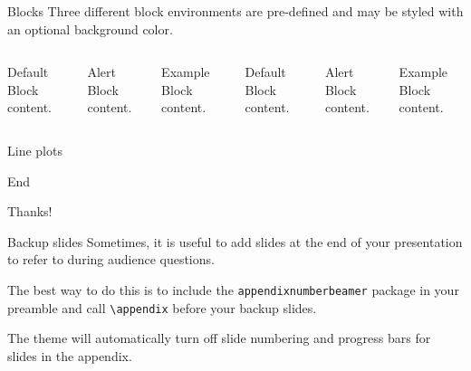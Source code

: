 \documentclass{kw}
\begin{document}
\begin{frame}{Blocks}
	Three different block environments are pre-defined and may be styled with an
	optional background color.
	
	\begin{columns}[T,onlytextwidth]
		\begin{block}{Default}
			Block content.
		\end{block}
		
		\begin{alertblock}{Alert}
			Block content.
		\end{alertblock}
		
		\begin{exampleblock}{Example}
			Block content.
		\end{exampleblock}
		
		
		\begin{block}{Default}
			Block content.
		\end{block}
		
		\begin{alertblock}{Alert}
			Block content.
		\end{alertblock}
		
		\begin{exampleblock}{Example}
			Block content.
		\end{exampleblock}
		
	\end{columns}
\end{frame}
\begin{frame}{Line plots}
	\begin{figure}
	\end{figure}
\end{frame}

\begin{frame}{End}
	\begin{center}
		\Huge Thanks!
	\end{center}
\end{frame}


\appendix
\begin{frame}[fragile]{Backup slides}
	Sometimes, it is useful to add slides at the end of your presentation to
	refer to during audience questions.
	
	The best way to do this is to include the \verb|appendixnumberbeamer|
	package in your preamble and call \verb|\appendix| before your backup slides.
	
	The theme will automatically turn off slide numbering and progress bars for
	slides in the appendix.
\end{frame}
\end{document}
